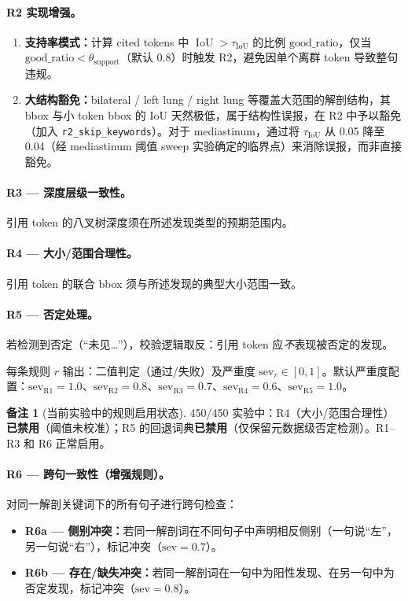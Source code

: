 \documentclass[11pt,a4paper]{article}
\newcommand{\IoU}{\operatorname{IoU}}
\theoremstyle{definition}
\newtheorem{remark}{备注}[section]
\begin{document}
\paragraph{R2 实现增强。}
\begin{enumerate}[nosep]
    \item \textbf{支持率模式：}计算 cited tokens 中 $\IoU > \tau_{\mathrm{IoU}}$ 的比例 $\mathrm{good\_ratio}$，仅当 $\mathrm{good\_ratio} < \theta_{\mathrm{support}}$（默认 0.8）时触发 R2，避免因单个离群 token 导致整句违规。
    \item \textbf{大结构豁免：}bilateral / left lung / right lung 等覆盖大范围的解剖结构，其 bbox 与小 token bbox 的 IoU 天然极低，属于结构性误报，在 R2 中予以豁免（加入 \texttt{r2\_skip\_keywords}）。对于 mediastinum，通过将 $\tau_{\mathrm{IoU}}$ 从 0.05 降至 0.04（经 mediastinum 阈值 sweep 实验确定的临界点）来消除误报，而非直接豁免。
\end{enumerate}

\paragraph{R3 --- 深度层级一致性。}
引用 token 的八叉树深度须在所述发现类型的预期范围内。

\paragraph{R4 --- 大小/范围合理性。}
引用 token 的联合 bbox 须与所述发现的典型大小范围一致。

\paragraph{R5 --- 否定处理。}
若检测到否定（``未见\ldots''），校验逻辑取反：引用 token 应\emph{不}表现被否定的发现。

每条规则 $r$ 输出：二值判定（通过/失败）及严重度 $\mathrm{sev}_r \in [0,1]$。默认严重度配置：$\mathrm{sev}_{\mathrm{R1}}=1.0$、$\mathrm{sev}_{\mathrm{R2}}=0.8$、$\mathrm{sev}_{\mathrm{R3}}=0.7$、$\mathrm{sev}_{\mathrm{R4}}=0.6$、$\mathrm{sev}_{\mathrm{R5}}=1.0$。

\begin{remark}[当前实验中的规则启用状态]
450/450 实验中：R4（大小/范围合理性）\textbf{已禁用}（阈值未校准）；R5 的回退词典\textbf{已禁用}（仅保留元数据级否定检测）。R1--R3 和 R6 正常启用。
\end{remark}

\paragraph{R6 --- 跨句一致性（增强规则）。}
对同一解剖关键词下的所有句子进行跨句检查：
\begin{itemize}[nosep]
    \item \textbf{R6a --- 侧别冲突：}若同一解剖词在不同句子中声明相反侧别（一句说``左''，另一句说``右''），标记冲突（$\mathrm{sev}=0.7$）。
    \item \textbf{R6b --- 存在/缺失冲突：}若同一解剖词在一句中为阳性发现、在另一句中为否定发现，标记冲突（$\mathrm{sev}=0.8$）。
\end{itemize}
\end{document}
